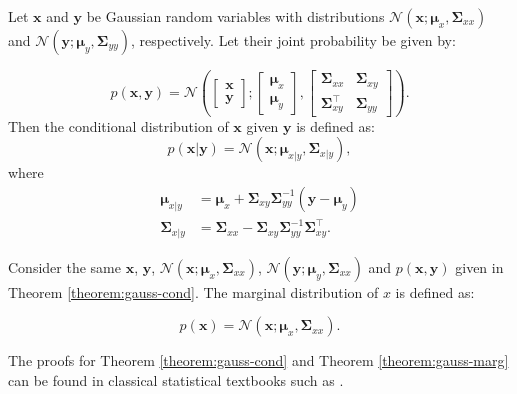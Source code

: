 \begin{theorem}\label{theorem:gauss-cond}
    Let $\mathbf{x}$ and $\mathbf{y}$ be Gaussian random variables with distributions $\mathscr{N}\left(\mathbf{x} ; \mathbf\mu_x, \mathbf\Sigma_{xx}\right)$ and $\mathscr{N}\left(\mathbf{y} ; \mathbf\mu_y, \mathbf\Sigma_{yy}\right)$, respectively. Let their joint probability be given by:

    \begin{equation}
        p(\mathbf{x}, \mathbf{y}) = \mathscr{N}\left(
            \begin{bmatrix}
                \mathbf{x} \\
                \mathbf{y}
            \end{bmatrix};
            \begin{bmatrix}
                \boldsymbol\mu_x \\
                \boldsymbol\mu_y
            \end{bmatrix},
            \begin{bmatrix}
                \mathbf{\Sigma}_{xx} & \mathbf{\Sigma}_{xy} \\
                \mathbf{\Sigma}_{xy}^\intercal & \mathbf{\Sigma}_{yy}
            \end{bmatrix}
        \right).
    \end{equation}
    \noindent Then the conditional distribution of $\mathbf{x}$ given $\mathbf{y}$ is defined as:
    \begin{equation}\label{eq:gauss-cond}
        p(\mathbf{x}|\mathbf{y}) =
        \mathscr{N}\left(\mathbf{x}; \boldsymbol\mu_{x|y}, \mathbf\Sigma_{x|y}\right),
    \end{equation}
    \noindent where
    \begin{align}
        \boldsymbol\mu_{x|y}
        &= \boldsymbol\mu_x + \mathbf{\Sigma}_{xy} \mathbf{\Sigma}_{yy}^{-1}(\mathbf{y} - \boldsymbol\mu_y) \\
        \mathbf\Sigma_{x|y} 
        &= \mathbf\Sigma_{xx} - \mathbf\Sigma_{xy}\mathbf\Sigma_{yy}^{-1}\mathbf\Sigma_{xy}^\intercal.\label{eq:gauss-cond-params}
    \end{align}
\end{theorem}

\begin{theorem}\label{theorem:gauss-marg}
    Consider the same $\mathbf{x}$, $\mathbf{y}$, $\mathscr{N}\left(\mathbf{x} ; \mathbf\mu_x, \mathbf\Sigma_{xx}\right)$, $\mathscr{N}\left(\mathbf{y} ; \mathbf\mu_y, \mathbf\Sigma_{xx}\right)$ and $p(\mathbf{x}, \mathbf{y})$ given in Theorem \ref{theorem:gauss-cond}. The marginal distribution of $x$ is defined as:

    \begin{equation}
        p(\mathbf{x}) = \mathscr{N}\left(\mathbf{x} ; \mathbf\mu_x, \mathbf\Sigma_{xx}\right).
    \end{equation}
\end{theorem}

The proofs for Theorem \ref{theorem:gauss-cond} and Theorem \ref{theorem:gauss-marg} can be found in classical statistical textbooks such as \cite[161--163]{johnsonAppliedMultivariateStatistical2007}.
